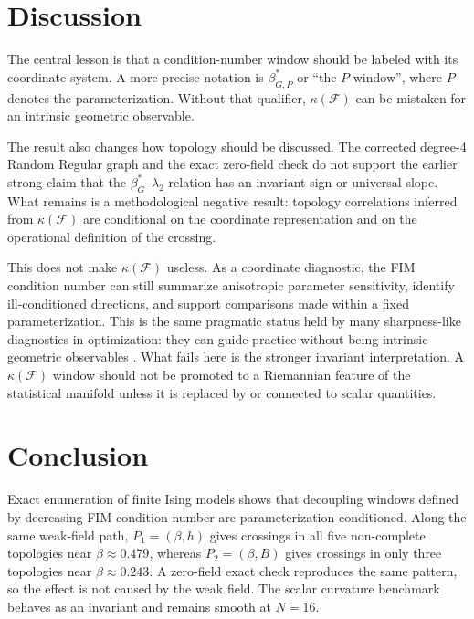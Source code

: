 \documentclass[11pt,a4paper]{article}
\begin{document}
\section{Discussion}
\label{sec:discussion}

The central lesson is that a condition-number window should be labeled with its coordinate system.  A more precise notation is $\beta_{G,P}^*$ or ``the $P$-window'', where $P$ denotes the parameterization.  Without that qualifier, $\kappa(\mathcal F)$ can be mistaken for an intrinsic geometric observable.

The result also changes how topology should be discussed.  The corrected degree-4 Random Regular graph and the exact zero-field check do not support the earlier strong claim that the $\beta_G^*$--$\lambda_2$ relation has an invariant sign or universal slope.  What remains is a methodological negative result: topology correlations inferred from $\kappa(\mathcal F)$ are conditional on the coordinate representation and on the operational definition of the crossing.

This does not make $\kappa(\mathcal F)$ useless.  As a coordinate diagnostic, the FIM condition number can still summarize anisotropic parameter sensitivity, identify ill-conditioned directions, and support comparisons made within a fixed parameterization.  This is the same pragmatic status held by many sharpness-like diagnostics in optimization: they can guide practice without being intrinsic geometric observables \citep{dinh2017sharp, foret2021sharpness}.  What fails here is the stronger invariant interpretation.  A $\kappa(\mathcal F)$ window should not be promoted to a Riemannian feature of the statistical manifold unless it is replaced by or connected to scalar quantities.

\section{Conclusion}
\label{sec:conclusion}

Exact enumeration of finite Ising models shows that decoupling windows defined by decreasing FIM condition number are parameterization-conditioned.  Along the same weak-field path, $P_1=(\beta,h)$ gives crossings in all five non-complete topologies near $\beta\approx0.479$, whereas $P_2=(\beta,B)$ gives crossings in only three topologies near $\beta\approx0.243$.  A zero-field exact check reproduces the same pattern, so the effect is not caused by the weak field.  The scalar curvature benchmark behaves as an invariant and remains smooth at $N=16$.
\end{document}
